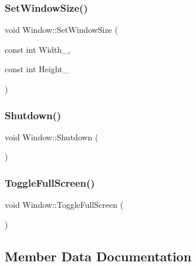 \hypertarget{class_ori_engine_1_1_window_a21db050c674219f29a985694739ff31e}{}\label{class_ori_engine_1_1_window_a21db050c674219f29a985694739ff31e} 
\subsubsection{\texorpdfstring{Set\+Window\+Size()}{SetWindowSize()}}
{\footnotesize\ttfamily void Window\+::\+Set\+Window\+Size (\begin{DoxyParamCaption}\item[{const int}]{Width\+\_\+,  }\item[{const int}]{Height\+\_\+ }\end{DoxyParamCaption})}

\hypertarget{class_ori_engine_1_1_window_a89c434ec340b4594c6c8af3f0bf58c9b}{}\label{class_ori_engine_1_1_window_a89c434ec340b4594c6c8af3f0bf58c9b} 
\subsubsection{\texorpdfstring{Shutdown()}{Shutdown()}}
{\footnotesize\ttfamily void Window\+::\+Shutdown (\begin{DoxyParamCaption}{ }\end{DoxyParamCaption})}

\hypertarget{class_ori_engine_1_1_window_a65149d93f9842363f53bdc3e07f459a6}{}\label{class_ori_engine_1_1_window_a65149d93f9842363f53bdc3e07f459a6} 
\subsubsection{\texorpdfstring{Toggle\+Full\+Screen()}{ToggleFullScreen()}}
{\footnotesize\ttfamily void Window\+::\+Toggle\+Full\+Screen (\begin{DoxyParamCaption}{ }\end{DoxyParamCaption})}



\subsection{Member Data Documentation}
\hypertarget{class_ori_engine_1_1_window_a31ccebb8ecb24ead816ae2559e1e36d2}{}\label{class_ori_engine_1_1_window_a31ccebb8ecb24ead816ae2559e1e36d2} 
